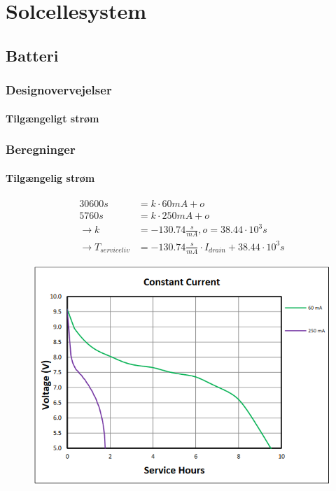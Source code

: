 \documentclass[../main.tex]{subfiles}
\begin{document}
\chapter{Solcellesystem} \label{Chap:Solcellesystem}

\section{Batteri}

\subsection{Designovervejelser}


\subsubsection{Tilgængeligt strøm}




\subsection{Beregninger}
\subsubsection{Tilgængelig strøm}


\begin{align*}
    30600s &= k \cdot 60mA + o \\
    5760s &= k \cdot 250mA + o \\
    \rightarrow k &= -130.74 \frac{s}{mA}, o = 38.44\cdot 10^3s\\
    \rightarrow T_{serviceliv} &= -130.74\frac{s}{mA} \cdot I_{drain} + 38.44\cdot 10^3s
\end{align*}


 \begin{figure}[H]
    \centering
    \includegraphics[scale=0.8]{Overleaf/Pictures/Grafer/Stroemogspaendingskurve.png}
    \captionsetup{format=hang}
    \caption{}
    \label{fig: batstrømkurve}
\end{figure}
\end{document}

